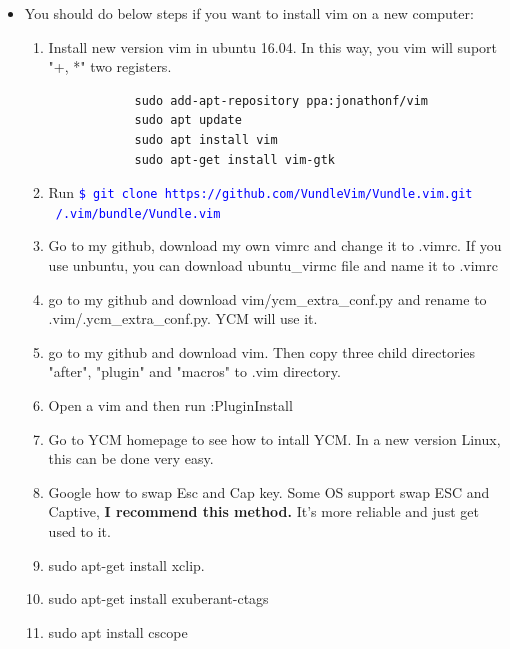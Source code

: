 \documentclass[a4paper,12pt,twoside]{book}
\newcommand{\linuxcommand}[1]{\texttt{\textcolor{blue}{\$ #1 \Pisymbol{psy}{191}}}}
\begin{document}
\begin{itemize}
		\item You should do below steps if you want to install vim on a new computer:

\begin{enumerate}
	\item Install new version vim in ubuntu 16.04. In this way, you vim will suport "+, *" two registers. 
			\begin{verbatim}
			sudo add-apt-repository ppa:jonathonf/vim
			sudo apt update
			sudo apt install vim
			sudo apt-get install vim-gtk
			\end{verbatim}

		\item Run \linuxcommand{git clone https://github.com/VundleVim/Vundle.vim.git ~/.vim/bundle/Vundle.vim}

		\item Go to my github, download my own vimrc and change it to .vimrc. If you use unbuntu, you can download ubuntu\_virmc file and name it to .vimrc
		
		\item go to my github and download vim/ycm\_extra\_conf.py and rename to .vim/.ycm\_extra\_conf.py. YCM will use it. 

		\item go to my github and download vim. Then copy three child directories "after", "plugin" and "macros" to .vim directory.

		\item Open a vim and then run :PluginInstall
		
		\item Go to YCM homepage to see how to intall YCM. In a new version Linux, this can be done very easy.
		
		\item Google how to swap Esc and Cap key. Some OS support swap ESC and Captive, \textbf{I recommend this method.} It's more reliable and just get used to it.
		\item sudo apt-get install xclip.  
		\item sudo apt-get install exuberant-ctags
        \item sudo apt install cscope
		
\end{enumerate}

\end{itemize}
\end{document}
